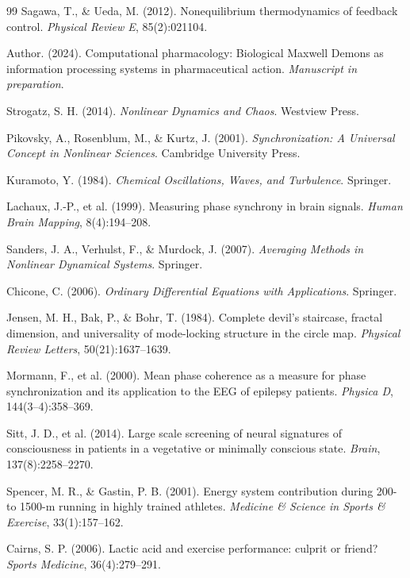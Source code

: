 \documentclass[12pt]{article}
\theoremstyle{remark}
\begin{document}
\begin{thebibliography}{99}
Sagawa, T., \& Ueda, M. (2012). Nonequilibrium thermodynamics of feedback control. \textit{Physical Review E}, 85(2):021104.

Author. (2024). Computational pharmacology: Biological Maxwell Demons as information processing systems in pharmaceutical action. \textit{Manuscript in preparation}.

Strogatz, S. H. (2014). \textit{Nonlinear Dynamics and Chaos}. Westview Press.

Pikovsky, A., Rosenblum, M., \& Kurtz, J. (2001). \textit{Synchronization: A Universal Concept in Nonlinear Sciences}. Cambridge University Press.

Kuramoto, Y. (1984). \textit{Chemical Oscillations, Waves, and Turbulence}. Springer.

Lachaux, J.-P., et al. (1999). Measuring phase synchrony in brain signals. \textit{Human Brain Mapping}, 8(4):194--208.

Sanders, J. A., Verhulst, F., \& Murdock, J. (2007). \textit{Averaging Methods in Nonlinear Dynamical Systems}. Springer.

Chicone, C. (2006). \textit{Ordinary Differential Equations with Applications}. Springer.

Jensen, M. H., Bak, P., \& Bohr, T. (1984). Complete devil's staircase, fractal dimension, and universality of mode-locking structure in the circle map. \textit{Physical Review Letters}, 50(21):1637--1639.

Mormann, F., et al. (2000). Mean phase coherence as a measure for phase synchronization and its application to the EEG of epilepsy patients. \textit{Physica D}, 144(3--4):358--369.

Sitt, J. D., et al. (2014). Large scale screening of neural signatures of consciousness in patients in a vegetative or minimally conscious state. \textit{Brain}, 137(8):2258--2270.

Spencer, M. R., \& Gastin, P. B. (2001). Energy system contribution during 200-to 1500-m running in highly trained athletes. \textit{Medicine \& Science in Sports \& Exercise}, 33(1):157--162.

Cairns, S. P. (2006). Lactic acid and exercise performance: culprit or friend? \textit{Sports Medicine}, 36(4):279--291.


\end{thebibliography}
\end{document}
